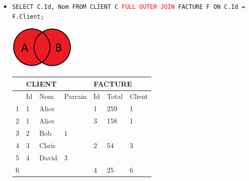 \documentclass[a4paper]{article}
\begin{document}
\begin{itemize}
\begin{itemize}
    \item \texttt{SELECT C.Id, Nom FROM CLIENT C \textcolor{red}{FULL OUTER JOIN} FACTURE F ON C.Id = F.Client;}
    \begin{center}
        \includegraphics[width=0.25\textwidth]{../images/full-outer-join-01.PNG}
    \end{center}
    \begin{center}
        \begin{tabular}{|l|l|l|l|l|l|l|} \hline
            & \multicolumn{3}{l|}{CLIENT} & \multicolumn{3}{l|}{FACTURE} \\ \hline
            & Id & Nom & Parrain & Id & Total & Client \\ \hline
            \rowcolor{orange!30}
            1 & 1 & Alice &   & 1 & 259 & 1 \\ \hline
            \rowcolor{orange!30}
            2 & 1 & Alice &   & 3 & 158 & 1 \\ \hline
            \rowcolor{orange!30}
            3 & 2 &   Bob & 1 &   &     &   \\ \hline
            \rowcolor{orange!30}
            4 & 3 & Chris &   & 2 &  54 & 3 \\ \hline
            \rowcolor{orange!30}
            5 & 4 & David & 3 &   &     &   \\ \hline
            \rowcolor{orange!30}
            6 &   &       &   & 4 &  25 & 6 \\ \hline
        \end{tabular}
    \end{center}



\end{itemize}
\end{itemize}
\end{document}

